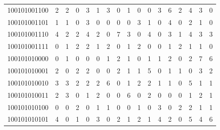 \documentclass[10pt,a4paper]{article}
\begin{document}
\begin{longtable}{ |c|c|c|c|c|c|c|c|c|c|c|c|c|c|c|c|c| }
    100101001100              & 2                            & 2                                & 0                            & 3                              & 1   & 3   & 0   & 1   & 0   & 0   & 3   & 6   & 2   & 4   & 3   & 0   \\
    100101001101              & 1                            & 1                                & 0                            & 3                              & 0   & 0   & 0   & 0   & 3   & 1   & 0   & 4   & 0   & 2   & 1   & 0   \\
    100101001110              & 4                            & 2                                & 2                            & 4                              & 2   & 0   & 7   & 3   & 0   & 4   & 0   & 3   & 1   & 4   & 3   & 3   \\
    100101001111              & 0                            & 1                                & 2                            & 2                              & 1   & 2   & 0   & 1   & 2   & 0   & 0   & 1   & 2   & 1   & 1   & 0   \\
    100101010000              & 0                            & 1                                & 0                            & 0                              & 0   & 1   & 2   & 1   & 0   & 1   & 1   & 2   & 0   & 2   & 7   & 6   \\
    100101010001              & 2                            & 0                                & 2                            & 2                              & 0   & 0   & 2   & 1   & 1   & 5   & 0   & 1   & 1   & 0   & 3   & 2   \\
    100101010010              & 3                            & 3                                & 2                            & 2                              & 2   & 6   & 0   & 1   & 2   & 2   & 1   & 1   & 0   & 5   & 1   & 1   \\
    100101010011              & 2                            & 3                                & 0                            & 1                              & 2   & 0   & 0   & 6   & 0   & 2   & 0   & 0   & 0   & 1   & 2   & 1   \\
    100101010100              & 0                            & 0                                & 2                            & 0                              & 1   & 1   & 0   & 0   & 1   & 0   & 3   & 0   & 2   & 2   & 1   & 1   \\
    100101010101              & 4                            & 0                                & 1                            & 0                              & 3   & 0   & 2   & 1   & 2   & 1   & 4   & 2   & 0   & 5   & 4   & 6   \\

\end{longtable}
\end{document}
